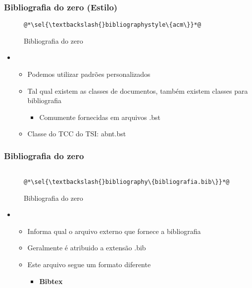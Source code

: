 \begin{frame}[fragile] \frametitle{Bibliografia do zero (Estilo)}
\vspace{-0.5cm}
\begin{figure}[!t]
\caption{Bibliografia do zero}
\begin{lstlisting}
@*\sel{\textbackslash{}bibliographystyle\{acm\}}*@

\end{lstlisting}
\ownsrc
\end{figure}

\begin{itemize}
	\item {}
	\begin{itemize}
		\item Podemos utilizar padrões personalizados
		\item Tal qual existem as classes de documentos, também existem classes para bibliografia
		\begin{itemize}
			\item Comumente fornecidas em arquivos .bst
		\end{itemize}
		\item Classe do TCC do TSI: abnt.bst
	\end{itemize}
\end{itemize}
\end{frame}

\begin{frame}[fragile] \frametitle{Bibliografia do zero}
\vspace{-0.5cm}
\begin{figure}[!t]
\caption{Bibliografia do zero}
\begin{lstlisting}

@*\sel{\textbackslash{}bibliography\{bibliografia.bib\}}*@
\end{lstlisting}
\ownsrc
\end{figure}

\begin{itemize}
	\item {}
	\begin{itemize}
		\item Informa qual o arquivo externo que fornece a bibliografia
		\item Geralmente é atribuido a extensão .bib
		\item Este arquivo segue um formato diferente
		\begin{itemize}
			\item \textbf{Bibtex}
		\end{itemize}
	\end{itemize}
\end{itemize}
\end{frame}

